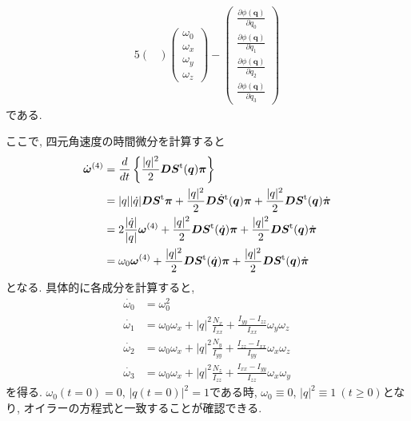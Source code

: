 \begin{alignat}{5}
\begin{pmatrix}
  \end{pmatrix}
  \begin{pmatrix}
    \omega_{0} \\ \omega_{x} \\ \omega_{y} \\ \omega_{z}
  \end{pmatrix}
  -
  \begin{pmatrix}
    \frac{\partial \phi(\bm{q})}{\partial q_{0}} \\
    \frac{\partial \phi(\bm{q})}{\partial q_{1}} \\
    \frac{\partial \phi(\bm{q})}{\partial q_{2}} \\
    \frac{\partial \phi(\bm{q})}{\partial q_{3}}
  \end{pmatrix}
\end{alignat}
である.

ここで, 四元角速度の時間微分を計算すると
\begin{align}
  \dot{\bm{\omega}}^{(4)}
  &=
  \frac{d}{dt}
  \left\{
    \frac{|q|^{2}}{2} \bm{D} \bm{S}^{\mathrm{t}}(\bm{q}) \bm{\pi}
  \right\}
  \notag \\
  &=
  |q||\dot{q}| \bm{D} \bm{S}^{\mathrm{t}} \bm{\pi}
  +
  \frac{|q|^{2}}{2} \bm{D} \dot{\bm{S}}^{\mathrm{t}}(\bm{q})\bm{\pi}
  +
  \frac{|q|^{2}}{2} \bm{D} \bm{S}^{\mathrm{t}}(\bm{q})\dot{\bm{\pi}}
  \notag \\
  &=
  2\frac{|\dot{q}|}{|q|} \bm{\omega}^{(4)}
  +
  \frac{|q|^{2}}{2} \bm{D} \bm{S}^{\mathrm{t}}(\dot{\bm{q}})\bm{\pi}
  +
  \frac{|q|^{2}}{2} \bm{D} \bm{S}^{\mathrm{t}}(\bm{q})\dot{\bm{\pi}}
  \notag \\
  &=
  \omega_{0} \bm{\omega}^{(4)}
  +
  \frac{|q|^{2}}{2} \bm{D} \bm{S}^{\mathrm{t}}(\dot{\bm{q}})\bm{\pi}
  +
  \frac{|q|^{2}}{2} \bm{D} \bm{S}^{\mathrm{t}}(\bm{q})\dot{\bm{\pi}}
\end{align}
となる. 具体的に各成分を計算すると,
\begin{align}
  \dot{\omega_{0}} &= \omega_{0}^{2}
  \\
  \dot{\omega_{1}} &=
  \omega_{0} \omega_{x}
  +
  |q|^{2} \frac{N_{x}}{I_{xx}} + \frac{I_{yy} - I_{zz}}{I_{xx}}\omega_{y}\omega_{z}
  \\
  \dot{\omega_{2}} &=
  \omega_{0} \omega_{x}
  +
  |q|^{2} \frac{N_{y}}{I_{yy}} + \frac{I_{zz} - I_{xx}}{I_{yy}}\omega_{x}\omega_{z}
  \\
  \dot{\omega_{3}} &=
  \omega_{0} \omega_{x}
  +
  |q|^{2} \frac{N_{z}}{I_{zz}} + \frac{I_{xx} - I_{yy}}{I_{zz}}\omega_{x}\omega_{y}
\end{align}
を得る. $\omega_{0}(t=0) = 0$, $|q(t=0)|^{2} =1$である時, $\omega_{0} \equiv 0$, $|q|^{2} \equiv 1 ~(t \ge 0)$となり, オイラーの方程式と一致することが確認できる.

